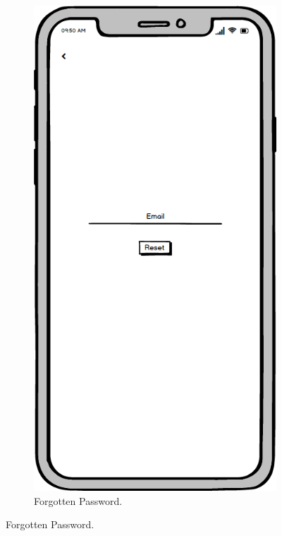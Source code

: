 \begin{figure}
    \centering
    \begin{subfigure}[b]{0.3\textwidth}
        \centering
        \includegraphics[width=\textwidth]{./graphics/design/Forgotten Password.png}
        \caption{Forgotten Password.}

\end{subfigure}
\end{figure}
